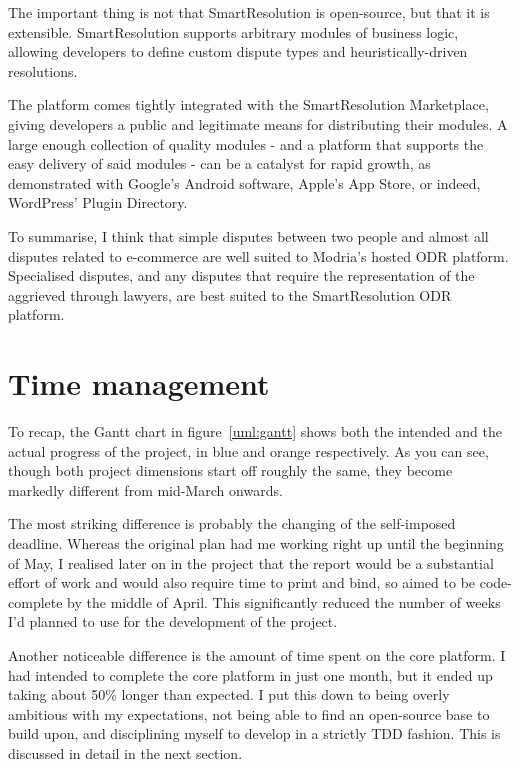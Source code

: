 The important thing is not that SmartResolution is open-source, but that it is extensible. SmartResolution supports arbitrary modules of business logic, allowing developers to define custom dispute types and heuristically-driven resolutions.

The platform comes tightly integrated with the SmartResolution Marketplace, giving developers a public and legitimate means for distributing their modules. A large enough collection of quality modules - and a platform that supports the easy delivery of said modules - can be a catalyst for rapid growth, as demonstrated with Google's Android software, Apple's App Store, or indeed, WordPress' Plugin Directory.

To summarise, I think that simple disputes between two people and almost all disputes related to e-commerce are well suited to Modria's hosted ODR platform. Specialised disputes, and any disputes that require the representation of the aggrieved through lawyers, are best suited to the SmartResolution ODR platform.

\section{Time management}

To recap, the Gantt chart in figure~\ref{uml:gantt} shows both the intended and the actual progress of the project, in blue and orange respectively. As you can see, though both project dimensions start off roughly the same, they become markedly different from mid-March onwards.

The most striking difference is probably the changing of the self-imposed deadline. Whereas the original plan had me working right up until the beginning of May, I realised later on in the project that the report would be a substantial effort of work and would also require time to print and bind, so aimed to be code-complete by the middle of April. This significantly reduced the number of weeks I'd planned to use for the development of the project.

Another noticeable difference is the amount of time spent on the core platform. I had intended to complete the core platform in just one month, but it ended up taking about 50\% longer than expected. I put this down to being overly ambitious with my expectations, not being able to find an open-source base to build upon, and disciplining myself to develop in a strictly TDD fashion. This is discussed in detail in the next section.


